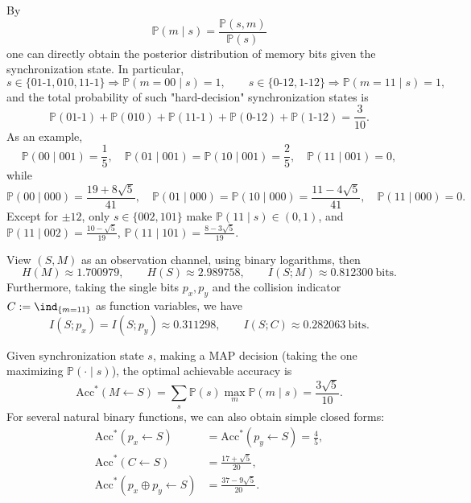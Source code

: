 \begin{remark}\label{rem:real-input-40-bayes-decode}
By
\[
\mathbb{P}(m\mid s)=\frac{\mathbb{P}(s,m)}{\mathbb{P}(s)}
\]
one can directly obtain the posterior distribution of memory bits given the synchronization state. In particular,
\[
s\in\{01\text{-}1,010,11\text{-}1\}\Rightarrow \mathbb{P}(m=00\mid s)=1,
\qquad
s\in\{0\text{-}12,1\text{-}12\}\Rightarrow \mathbb{P}(m=11\mid s)=1,
\]
and the total probability of such "hard-decision" synchronization states is
\[
\mathbb{P}(01\text{-}1)+\mathbb{P}(010)+\mathbb{P}(11\text{-}1)+\mathbb{P}(0\text{-}12)+\mathbb{P}(1\text{-}12)=\frac{3}{10}.
\]
As an example,
\[
\mathbb{P}(00\mid 001)=\frac15,\quad
\mathbb{P}(01\mid 001)=\mathbb{P}(10\mid 001)=\frac25,\quad
\mathbb{P}(11\mid 001)=0,
\]
while
\[
\mathbb{P}(00\mid 000)=\frac{19+8\sqrt5}{41},\quad
\mathbb{P}(01\mid 000)=\mathbb{P}(10\mid 000)=\frac{11-4\sqrt5}{41},\quad
\mathbb{P}(11\mid 000)=0.
\]
Except for $\pm12$, only $s\in\{002,101\}$ make $\mathbb{P}(11\mid s)\in(0,1)$,
and
\(
\mathbb{P}(11\mid 002)=\frac{10-\sqrt5}{19}
\),
\(
\mathbb{P}(11\mid 101)=\frac{8-3\sqrt5}{19}
\).
\end{remark}

\begin{remark}\label{rem:real-input-40-mutual-info}
View $(S,M)$ as an observation channel, using binary logarithms, then
\[
H(M)\approx 1.700979,\qquad
H(S)\approx 2.989758,\qquad
I(S;M)\approx 0.812300\ \text{bits}.
\]
Furthermore, taking the single bits $p_x,p_y$ and the collision indicator $C:=\ind_{\{m=11\}}$ as function variables, we have
\[
I(S;p_x)=I(S;p_y)\approx 0.311298,\qquad
I(S;C)\approx 0.282063\ \text{bits}.
\]
\end{remark}

\begin{proposition}\label{prop:real-input-40-map-accuracies}
Given synchronization state $s$, making a MAP decision (taking the one maximizing $\mathbb{P}(\cdot\mid s)$), the optimal achievable accuracy is
\[
\mathrm{Acc}^*(M\leftarrow S)=\sum_s \mathbb{P}(s)\max_m \mathbb{P}(m\mid s)=\frac{3\sqrt5}{10}.
\]
For several natural binary functions, we can also obtain simple closed forms:
\[
\begin{aligned}
\mathrm{Acc}^*(p_x\leftarrow S)&=\mathrm{Acc}^*(p_y\leftarrow S)=\frac45,\\
\mathrm{Acc}^*(C\leftarrow S)&=\frac{17+\sqrt5}{20},\\
\mathrm{Acc}^*(p_x\oplus p_y\leftarrow S)&=\frac{37-9\sqrt5}{20}.
\end{aligned}
\]
\end{proposition}

